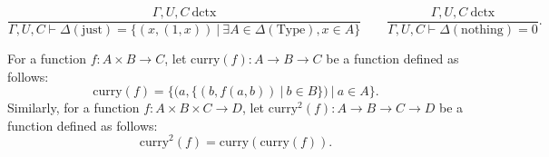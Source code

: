 \documentclass[11pt]{article}
\begin{document}
\begin{equation}
	\frac{\Gamma,U,C\ \text{dctx}}
	{\Gamma,U,C \vdash \Delta(\text{just}) = \{(x,(1,x))\ |\ \exists A \in \Delta(\text{Type}), x \in A\}}
	\qquad
	\frac{\Gamma,U,C\ \text{dctx}}
	{\Gamma,U,C \vdash \Delta(\text{nothing}) = 0}.
\end{equation}

For a function $f : A \times B \to C$, let $\text{curry}(f) : A \to B \to C$ be a function
defined as follows:
\begin{equation}
	\text{curry}(f) = \{(a, \{(b, f(a, b))\ |\ b \in B\})\ |\ a \in A\}.
\end{equation}
Similarly, for a function $f : A \times B \times C \to D$, let
$\text{curry}^2(f) : A \to B \to C \to D$ be a function defined as follows:
\begin{equation}
	\text{curry}^2(f) = \text{curry}(\text{curry}(f)).
\end{equation}
\end{document}
